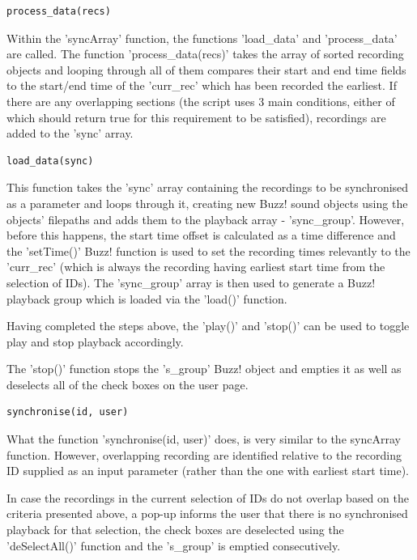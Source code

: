 \documentclass{l3proj}
\begin{document}
\begin{verbatim}
process_data(recs)
\end{verbatim}

Within the 'syncArray' function, the functions 'load\_data' and 'process\_data' are called. The function 'process\_data(recs)' takes the array of sorted recording objects and looping through all of them compares their start and end time fields to the start/end time of the 'curr\_rec' which has been recorded the earliest. If there are any overlapping sections (the script uses 3 main conditions, either of which should return true for this requirement to be satisfied), recordings are added to the 'sync' array.

\begin{verbatim}
load_data(sync)
\end{verbatim}

This function takes the 'sync' array containing the recordings to be synchronised as a parameter and loops through it, creating new Buzz! sound objects using the objects' filepaths and adds them to the playback array - 'sync\_group'. However, before this happens, the start time offset is calculated as a time difference and the 'setTime()' Buzz! function is used to set the recording times relevantly to the 'curr\_rec' (which is always the recording having earliest start time from the selection of IDs). The 'sync\_group' array is then used to generate a Buzz! playback group which is loaded via the 'load()' function.

Having completed the steps above, the 'play()' and 'stop()' can be used to toggle play and stop playback accordingly.

The 'stop()' function stops the 's\_group' Buzz! object and empties it as well as deselects all of the check boxes on the user page.

\begin{verbatim}
synchronise(id, user)
\end{verbatim}

What the function 'synchronise(id, user)' does, is very similar to the syncArray function. However, overlapping recording are identified relative to the recording ID supplied as an input parameter (rather than the one with earliest start time).

In case the recordings in the current selection of IDs do not overlap based on the criteria presented above, a pop-up informs the user that there is no synchronised playback for that selection, the check boxes are deselected using the 'deSelectAll()' function and the 's\_group' is emptied consecutively.
\end{document}
